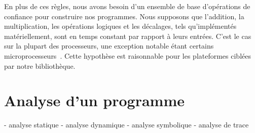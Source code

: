 En plus de ces règles, nous avons besoin d'un ensemble de base d'opérations de confiance pour construire nos programmes. Nous supposons que l'addition, la multiplication, les opérations logiques et les décalages, tels qu'implémentés matériellement, sont en temps constant par rapport à leurs entrées. C'est le cas sur la plupart des processeurs, une exception notable étant certains microprocesseurs~\cite{Por}. Cette hypothèse est raisonnable pour les plateformes ciblées par notre bibliothèque.

\cite{binsecRel2019}


\section{Analyse d'un programme}


 - analyse statique
 - analyse dynamique
 - analyse symbolique
 - analyse de trace

